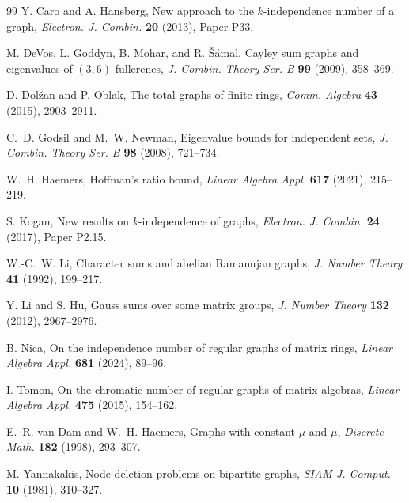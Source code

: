 \documentclass[11pt]{article}
\theoremstyle{definition}
\begin{document}
\begin{thebibliography}{99}
Y. Caro and A. Hansberg,
New approach to the $k$-independence number of a graph,
\emph{Electron. J. Combin.} \textbf{20} (2013), Paper P33.

M. DeVos, L. Goddyn, B. Mohar, and R. \v{S}\'amal,
Cayley sum graphs and eigenvalues of $(3,6)$-fullerenes,
\emph{J. Combin. Theory Ser. B} \textbf{99} (2009), 358--369.

D. Dol\v{z}an and P. Oblak,
The total graphs of finite rings,
\emph{Comm. Algebra} \textbf{43} (2015), 2903--2911.

C.~D. Godsil and M.~W. Newman,
Eigenvalue bounds for independent sets,
\emph{J. Combin. Theory Ser. B} \textbf{98} (2008), 721--734.

W.~H. Haemers,
Hoffman's ratio bound,
\emph{Linear Algebra Appl.} \textbf{617} (2021), 215--219.

S. Kogan,
New results on $k$-independence of graphs,
\emph{Electron. J. Combin.} \textbf{24} (2017), Paper P2.15.

W.-C.~W. Li,
Character sums and abelian Ramanujan graphs,
\emph{J. Number Theory} \textbf{41} (1992), 199--217.

Y. Li and S. Hu,
Gauss sums over some matrix groups,
\emph{J. Number Theory} \textbf{132} (2012), 2967--2976.

B. Nica,
On the independence number of regular graphs of matrix rings,
\emph{Linear Algebra Appl.} \textbf{681} (2024), 89--96.

I. Tomon,
On the chromatic number of regular graphs of matrix algebras,
\emph{Linear Algebra Appl.} \textbf{475} (2015), 154--162.

E.~R. van Dam and W.~H. Haemers,
Graphs with constant $\mu$ and $\overline\mu$,
\emph{Discrete Math.} \textbf{182} (1998), 293--307.

M. Yannakakis,
Node-deletion problems on bipartite graphs,
\emph{SIAM J. Comput.} \textbf{10} (1981), 310--327.

\end{thebibliography}
\end{document}
